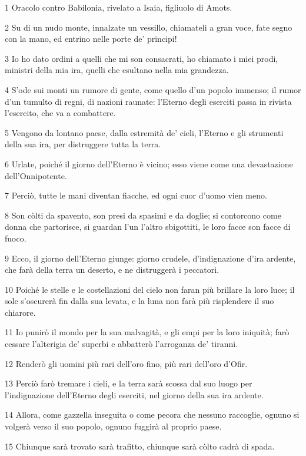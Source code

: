 \par 1 Oracolo contro Babilonia, rivelato a Isaia, figliuolo di Amots.
\par 2 Su di un nudo monte, innalzate un vessillo, chiamateli a gran voce, fate segno con la mano, ed entrino nelle porte de' principi!
\par 3 Io ho dato ordini a quelli che mi son consacrati, ho chiamato i miei prodi, ministri della mia ira, quelli che esultano nella mia grandezza.
\par 4 S'ode sui monti un rumore di gente, come quello d'un popolo immenso; il rumor d'un tumulto di regni, di nazioni raunate: l'Eterno degli eserciti passa in rivista l'esercito, che va a combattere.
\par 5 Vengono da lontano paese, dalla estremità de' cieli, l'Eterno e gli strumenti della sua ira, per distruggere tutta la terra.
\par 6 Urlate, poiché il giorno dell'Eterno è vicino; esso viene come una devastazione dell'Onnipotente.
\par 7 Perciò, tutte le mani diventan fiacche, ed ogni cuor d'uomo vien meno.
\par 8 Son còlti da spavento, son presi da spasimi e da doglie; si contorcono come donna che partorisce, si guardan l'un l'altro sbigottiti, le loro facce son facce di fuoco.
\par 9 Ecco, il giorno dell'Eterno giunge: giorno crudele, d'indignazione d'ira ardente, che farà della terra un deserto, e ne distruggerà i peccatori.
\par 10 Poiché le stelle e le costellazioni del cielo non faran più brillare la loro luce; il sole s'oscurerà fin dalla sua levata, e la luna non farà più risplendere il suo chiarore.
\par 11 Io punirò il mondo per la sua malvagità, e gli empi per la loro iniquità; farò cessare l'alterigia de' superbi e abbatterò l'arroganza de' tiranni.
\par 12 Renderò gli uomini più rari dell'oro fino, più rari dell'oro d'Ofir.
\par 13 Perciò farò tremare i cieli, e la terra sarà scossa dal suo luogo per l'indignazione dell'Eterno degli eserciti, nel giorno della sua ira ardente.
\par 14 Allora, come gazzella inseguita o come pecora che nessuno raccoglie, ognuno si volgerà verso il suo popolo, ognuno fuggirà al proprio paese.
\par 15 Chiunque sarà trovato sarà trafitto, chiunque sarà còlto cadrà di spada.
